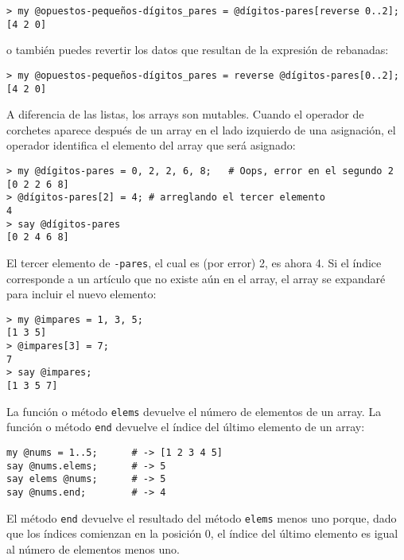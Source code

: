\begin{verbatim}
> my @opuestos-pequeños-dígitos_pares = @dígitos-pares[reverse 0..2];
[4 2 0]
\end{verbatim}

o también puedes revertir los datos que resultan de la expresión
de rebanadas:

\begin{verbatim}
> my @opuestos-pequeños-dígitos_pares = reverse @dígitos-pares[0..2];
[4 2 0]
\end{verbatim}

A diferencia de las listas, los arrays son mutables. 
Cuando el operador de corchetes aparece después de un array 
en el lado izquierdo de una asignación, el operador identifica el
elemento del array que será asignado:

\begin{verbatim}
> my @dígitos-pares = 0, 2, 2, 6, 8;   # Oops, error en el segundo 2
[0 2 2 6 8]
> @dígitos-pares[2] = 4; # arreglando el tercer elemento
4
> say @dígitos-pares
[0 2 4 6 8]
\end{verbatim}
%

El tercer elemento de {\tt {}-pares}, el cual es (por error) 2,
es ahora 4. Si el índice corresponde a un artículo que no existe aún
en el array, el array se expandaré para incluir el nuevo elemento:

\begin{verbatim}
> my @impares = 1, 3, 5;
[1 3 5]
> @impares[3] = 7;
7
> say @impares;
[1 3 5 7]
\end{verbatim}


La función o método {\tt elems} devuelve el número
de elementos de un array. La función o método {\tt end}
devuelve el índice del último elemento de un array:

\begin{verbatim}
my @nums = 1..5;      # -> [1 2 3 4 5]
say @nums.elems;      # -> 5
say elems @nums;      # -> 5
say @nums.end;        # -> 4
\end{verbatim}

El método {\tt end} devuelve el resultado del método 
{\tt elems} menos uno porque, dado que los índices comienzan
en la posición 0, el índice del último elemento es igual
al número de elementos menos uno.


